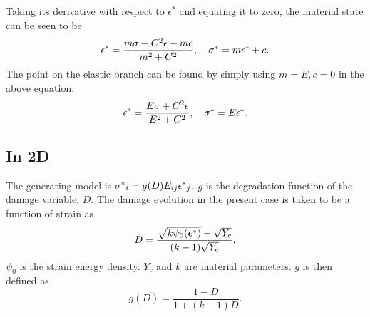 \documentclass[10pt]{elsarticle}
\begin{document}
Taking its derivative with respect to $\epsilon^*$ and equating it to zero, the material state can be seen to be
\begin{equation}
	\epsilon^* = \frac{m \sigma + C^2 \epsilon -mc}{m^2 + C^2}, \quad \mbox{$\sigma^*$} = m \mbox{$\epsilon^*$}+c. \label{damage_branch_material_state}
\end{equation}
The point on the elastic branch can be found by simply using $m=E, c=0$ in the above equation.
\begin{equation}
	\epsilon^* = \frac{E \sigma + C^2 \epsilon}{E^2 + C^2}, \quad \mbox{$\sigma^*$} = E \mbox{$\epsilon^*$}. \label{elastic_branch_material_state}
\end{equation}

\subsection*{In 2D}
The generating model is $\mbox{$\sigma^*$}_i = g(D) E_{ij} \mbox{$\epsilon^*$}_j$. $g$ is the degradation function of the damage variable, $D$. The damage evolution in the present case is taken to be a function of strain as 
\begin{equation}
D = \frac{\sqrt{k \psi_0(\mbox{\boldmath $\epsilon$}^*)} - \sqrt{Y_c}}{(k-1)\sqrt{Y_c}}.
\end{equation}
$\psi_0$ is the strain energy density. $Y_c$ and $k$ are material parameters. $g$ is then defined as
\begin{equation}
	g(D) = \frac{1-D}{1+(k-1)D}.
\end{equation}
\end{document}
